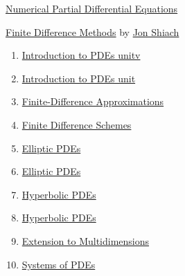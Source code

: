 \documentclass[11pt]{article}
\begin{document}
	\kaishu 
	\setcounter{section}{0}
	\begin{center}
		{\LARGE  \href{https://en.wikipedia.org/wiki/Numerical_methods_for_partial_differential_equations}{Numerical Partial Differential Equations}}
		
		
	\end{center}
\setcounter{page}{1}


\begin{center}
	{\large   \href{https://www.youtube.com/playlist?list=PLgPpaTsP_3Dq5KsWd6-8wmjNs3ipnvCU3}{Finite Difference Methods}} by {\large \href{https://jonshiach.github.io/}{Jon Shiach}}
\end{center}

\begin{multicols}{2}
	\begin{enumerate}
		\item \href{https://mp.weixin.qq.com/s/ix6b3RuE8jfu7ShyWCF8UQ}{Introduction to PDEs unitv}	%
		\item \href{https://mp.weixin.qq.com/s/tCxpaNM1BmIVMZfVclu--w}{Introduction to PDEs unit }	%
		\item \href{https://mp.weixin.qq.com/s/-NY0BtVqtIGHExZL5yoY7g}{Finite-Difference Approximations}	%
		\item \href{https://mp.weixin.qq.com/s/rcs5SKRaIDUtpv9Gs0VjIw}{Finite Difference Schemes}	%
		\item \href{https://mp.weixin.qq.com/s/Dk-uyz5RfBniCce6bdrkLQ}{Elliptic PDEs }	%
		\item \href{https://mp.weixin.qq.com/s/qsTc1B8vZX5VrRKnajF62g}{Elliptic PDEs }	%
		\item \href{https://mp.weixin.qq.com/s/8xukMKjB8bLrdiIgkI_2dQ}{Hyperbolic PDEs }	%
		\item \href{https://mp.weixin.qq.com/s/8tAzbTxm8gJBmnu21fccPw}{Hyperbolic PDEs }	%
		\item \href{https://mp.weixin.qq.com/s/t76wz9gXa_oMhqj2vQ9a4g}{Extension to Multidimensions}	%
		\item \href{https://mp.weixin.qq.com/s/46EyRd-LDzZG4R90S4IesA}{Systems of PDEs}	%
	\end{enumerate}
	
\end{multicols}
\end{document}

